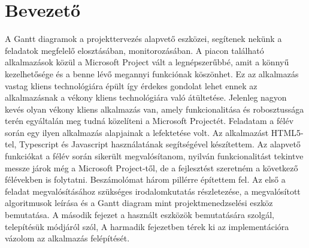 \chapter*{Bevezető}

\hspace{2mm} A Gantt diagramok a projekttervezés alapvető eszközei, segítenek nekünk a feladatok megfelelő elosztásában, monitorozásában. A piacon található alkalmazások közül a Microsoft Project vált a legnépszerűbbé, amit a könnyű kezelhetősége és a benne lévő megannyi funkciónak köszönhet. Ez az alkalmazás vastag kliens technológiára épült így érdekes gondolat lehet ennek az alkalmazásnak a vékony kliens technológiára való átültetése. Jelenleg nagyon kevés olyan vékony kliens alkalmazás van, amely funkcionalitása és robosztussága terén egyáltalán meg tudná közelíteni a Microsoft Projectét. Feladatam a félév során egy ilyen alkalmazás alapjainak a lefektetése volt. Az alkalmazást HTML5-tel, Typescript és Javascript használatának segítségével készítettem.\newline
\indent Az alapvető funkciókat a félév során sikerült megvalósítanom, nyilván funkcionalitást tekintve messze járok még a Microsoft Project-től, de a fejlesztést szeretném a következő félévekben is folytatni. Beszámolómat három pillérre építettem fel. Az első a feladat megvalósításához szükséges irodalomkutatás részletezése, a megvalósított algoritmusok leírása és a Gantt diagram mint projektmenedzselési eszköz bemutatása. A második fejezet a használt eszközök bemutatására szolgál, telepítésük módjáról szól, A harmadik fejezetben térek ki az implementációra vázolom az alkalmazás felépítését.
